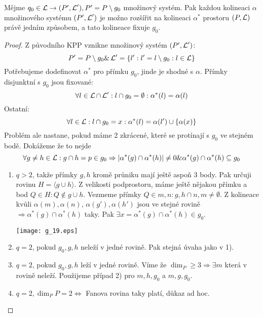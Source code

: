 \begin{lemma}\label{kpp:extension}
    Mějme $q_0\in\operatorname{\mathcal{L}}\rightarrow (P',\operatorname{\mathcal{L}}'), P' = P\setminus g_0$ množinový systém.
    Pak každou kolineaci $\alpha$ množinového systému $(P',\operatorname{\mathcal{L}}')$ je možno rozšířit na kolineaci $\alpha^*$ prostoru $(P, \operatorname{\mathcal{L}})$ právě jedním způsobem, a tato kolineace fixuje $g_0$.
\end{lemma}
\begin{proof}
	Z původního KPP vznikne množinový systém $(P',\operatorname{\mathcal{L}}')$:
	\[ P' = P\setminus g_0 \& \operatorname{\mathcal{L}}' = \{ l': l' = l \setminus g_0: l \in \operatorname{\mathcal{L}} \} \]
	Potřebujeme dodefinovat $\alpha^*$ pro přímku $g_0$, jinde je shodné s $\alpha$.
	Přímky disjunktní s $g_0$ jsou fixované:
	\[ \forall l \in \operatorname{\mathcal{L}} \cap \operatorname{\mathcal{L}}': l \cap g_0 = \emptyset: \alpha^*(l) = \alpha(l) \]
	Ostatní:
	\[ \forall l \in \operatorname{\mathcal{L}}: l \cap g_0 = x: \alpha^*(l) = \alpha(l') \cup \{ \alpha(x) \} \]
	Problém ale nastane, pokud máme 2 zkrácené, které se protínají s $g_0$ ve stejném bodě.
	Dokážeme že to nejde
	\[ \forall g \ne h \in \operatorname{\mathcal{L}}: g \cap h = p \in g_0 \Rightarrow |\alpha^*(g) \cap \alpha^*(h)| \ne 0 \& \alpha^*(g) \cap \alpha^*(h) \subseteq g_0 \]
    \begin{enumerate}
	\item $q > 2$, takže přímky $g, h$ kromě průniku mají ještě aspoň 3 body.
		    Pak určuji rovinu $H = \langle g \cup h \rangle$.
		    Z velikosti podprostoru, máme ještě nějakou přímku a bod $Q \in H: Q \notin g \cup h$.
		    Vezmeme přímky $Q \in m, n: g,h \cap n,m \ne \emptyset$.
		    Z kolineace kvůli $\alpha(m), \alpha(n)$, $\alpha(g'), \alpha(h')$ jsou ve stejné rovině $\Rightarrow \alpha^*(g) \cap \alpha^*(h)$ taky.
		    Pak $\exists x = \alpha^*(g) \cap \alpha^*(h) \in g_0$.

    	\texttt{[image: g\_19.eps]}

	\item $q = 2$, pokud $g_0, g, h$ neleží v jedné rovině.
		Pak stejná úvaha jako v 1).

	\item $q = 2$, pokud $g_0, g, h$ leží v jedné rovině.
		Víme že $\dim_P \geq 3 \Rightarrow \exists m$ která v rovině neleží.
		Použijeme případ 2) pro $m, h, g_0$ a $m, g, g_0$.
	\item $q = 2, \dim_P P = 2 \iff$ Fanova rovina taky platí, důkaz ad hoc.
    \end{enumerate}
\end{proof}


